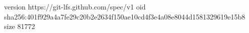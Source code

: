 version https://git-lfs.github.com/spec/v1
oid sha256:401f929a4a7fe29c20b2e2634f150ae10cd4f3e4a08e8044d1581329619e15b8
size 81772
